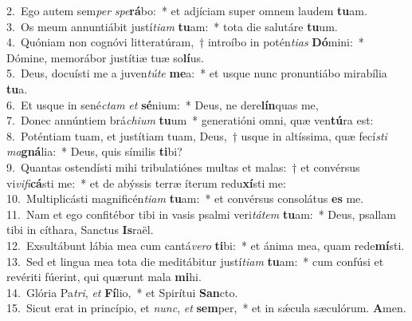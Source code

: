 {2.~}Ego autem sem\textit{per} \textit{spe}\textbf{rá}bo:~* et adjíciam super omnem laudem \textbf{tu}am.\\
{3.~}Os meum annuntiábit justí\textit{ti}\textit{am} \textbf{tu}am:~* tota die salutáre \textbf{tu}um.\\
{4.~}Quóniam non cognóvi litteratúram,~† introíbo in potén\textit{ti}\textit{as} \textbf{Dó}mini:~* Dómine, memorábor justítiæ tuæ so\textbf{lí}us.\\
{5.~}Deus, docuísti me a juven\textit{tú}\textit{te} \textbf{me}a:~* et usque nunc pronuntiábo mirabília \textbf{tu}a.\\
{6.~}Et usque in sené\textit{ctam} \textit{et} \textbf{sé}nium:~* Deus, ne dere\textbf{lín}quas me,\\
{7.~}Donec annúntiem brá\textit{chi}\textit{um} \textbf{tu}um~* generatióni omni, quæ ven\textbf{tú}ra est:\\
{8.~}Poténtiam tuam, et justítiam tuam, Deus,~† usque in altíssima, quæ fecí\textit{sti} \textit{ma}\textbf{gná}lia:~* Deus, quis símilis \textbf{ti}bi?\\
{9.~}Quantas ostendísti mihi tribulatiónes multas et malas:~† et convérsus vi\textit{vi}\textit{fi}\textbf{cá}sti me:~* et de abýssis terræ íterum redu\textbf{xí}sti me:\\
{10.~}Multiplicásti magnificén\textit{ti}\textit{am} \textbf{tu}am:~* et convérsus consolátus \textbf{es} me.\\
{11.~}Nam et ego confitébor tibi in vasis psalmi veri\textit{tá}\textit{tem} \textbf{tu}am:~* Deus, psallam tibi in cíthara, Sanctus \textbf{Is}raël.\\
{12.~}Exsultábunt lábia mea cum cantá\textit{ve}\textit{ro} \textbf{ti}bi:~* et ánima mea, quam rede\textbf{mí}sti.\\
{13.~}Sed et lingua mea tota die meditábitur justí\textit{ti}\textit{am} \textbf{tu}am:~* cum confúsi et revériti fúerint, qui quærunt mala \textbf{mi}hi.\\
{14.~}Glória Pa\textit{tri}, \textit{et} \textbf{Fí}lio,~* et Spirítui \textbf{San}cto.\\
{15.~}Sicut erat in princípio, et \textit{nunc}, \textit{et} \textbf{sem}per,~* et in sǽcula sæculórum. \textbf{A}men.\\

